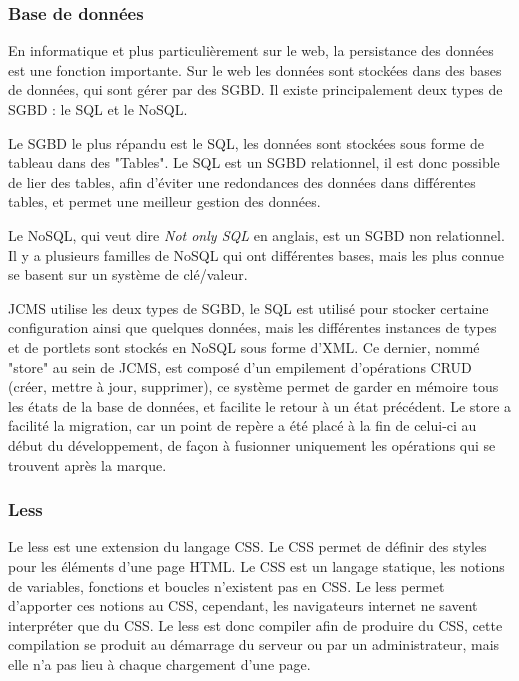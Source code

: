 \documentclass[12pt,a4paper]{article}
\begin{document}
\subsubsection{Base de données}
En informatique et plus particulièrement sur le web, la persistance des données est une fonction importante. Sur le web les données sont stockées dans des bases de données, qui sont gérer par des \gls{SGBD}. Il existe principalement deux types de \gls{SGBD} : le SQL et le NoSQL.\par 
\medskip
Le \gls{SGBD} le plus répandu est le SQL, les données sont stockées sous forme de tableau dans des "Tables". Le SQL est un \gls{SGBD} relationnel, il est donc possible de lier des tables, afin d'éviter une redondances des données dans différentes tables, et permet une meilleur gestion des données.\par
\medskip
Le NoSQL, qui veut dire \textit{Not only SQL} en anglais, est un \gls{SGBD} non relationnel. Il y a plusieurs familles de NoSQL qui ont différentes bases, mais les plus connue se basent sur un système de clé/valeur.\par
\medskip
\gls{JCMS} utilise les deux types de \gls{SGBD}, le SQL est utilisé pour stocker certaine configuration ainsi que quelques données, mais les différentes instances de types et de portlets sont stockés en NoSQL sous forme d'XML. Ce dernier, nommé "store" au sein de \gls{JCMS}, est composé d'un empilement d'opérations CRUD (créer, mettre à jour, supprimer), ce système permet de garder en mémoire tous les états de la base de données, et facilite le retour à un état précédent. Le store a facilité la migration, car un point de repère a été placé à la fin de celui-ci au début du développement, de façon à fusionner uniquement les opérations qui se trouvent après la marque.\par

\subsubsection{Less}
Le less est une extension du langage CSS. Le CSS permet de définir des styles pour les éléments d'une page HTML. Le CSS est un langage statique, les notions de variables, fonctions et boucles n'existent pas en CSS. Le less permet d'apporter ces notions au CSS, cependant, les navigateurs internet ne savent interpréter que du CSS. Le less est donc compiler afin de produire du CSS, cette compilation se produit au démarrage du serveur ou par un administrateur, mais elle n'a pas lieu à chaque chargement d'une page.\par 
\end{document}
